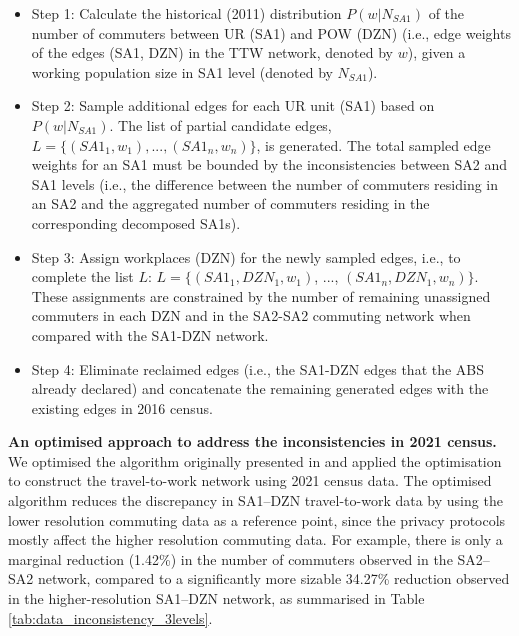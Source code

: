 \documentclass{article}
\begin{document}
\begin{appendices}
\begin{itemize}
    \item Step 1: Calculate the historical (2011) distribution $P(w|N_{SA1})$ of the number of commuters between UR (SA1) and POW (DZN) (i.e., edge weights of the edges (SA1, DZN) in the TTW network, denoted by $w$), given a working population size in SA1 level (denoted by $N_{SA1}$).
    \item Step 2: Sample additional edges for each UR unit (SA1) based on $P(w|N_{SA1})$. The list of partial candidate edges, $L=\{(SA1_1, w_1), ..., (SA1_n, w_n)\}$, is generated. The total sampled edge weights for an SA1 must be bounded by the inconsistencies between SA2 and SA1 levels (i.e., the difference between the number of commuters residing in an SA2 and the aggregated number of commuters residing in the corresponding decomposed SA1s).
    \item Step 3: Assign workplaces (DZN) for the newly sampled edges, i.e., to complete the list $L$: $L=\{(SA1_1, DZN_1, w_1)$, ..., $(SA1_n, DZN_1, w_n)\}$. These assignments are constrained by the number of remaining unassigned commuters in each DZN and in the SA2-SA2 commuting network when compared with the SA1-DZN network.
    \item Step 4: Eliminate reclaimed edges (i.e., the SA1-DZN edges that the ABS already declared) and concatenate the remaining generated edges with the existing edges in 2016 census.
\end{itemize}

\textbf{An optimised approach to address the inconsistencies in 2021 census.} We optimised the algorithm originally presented in \cite{fair_creating_2019} and applied the optimisation to construct the travel-to-work network using 2021 census data. The optimised algorithm reduces the discrepancy in SA1--DZN travel-to-work data by using the lower resolution commuting data as a reference point, since the privacy protocols mostly affect the higher resolution commuting data. For example, there is only a marginal reduction (1.42\%) in the number of commuters observed in the SA2--SA2 network, compared to a significantly more sizable 34.27\% reduction observed in the higher-resolution SA1--DZN network, as summarised in Table \ref{tab:data_inconsistency_3levels}. 


\end{appendices}
\end{document}
